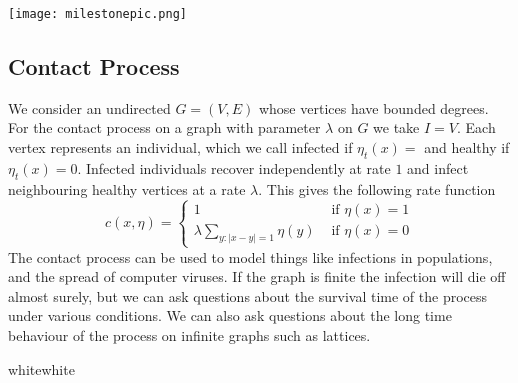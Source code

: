 \documentclass[14pt,a2paper,landscape]{article}
\begin{document}
\begin{multicols*}{3}
{\begin{center}
\texttt{[image: milestonepic.png]}
\end{center}

\subsection*{Contact Process}
We consider an undirected $G=(V,E)$ whose vertices have bounded degrees. For the contact process on 
a graph with parameter $\lambda$ on $G$ we take $I=V$. Each vertex represents an individual, which we call 
infected if $\eta_{t}(x)=$ and healthy if $\eta_{t}(x)=0$. Infected individuals recover independently at rate $1$
and infect neighbouring healthy vertices at a rate $\lambda$. This gives the following rate function
\begin{equation*}
c(x, \eta)=
\begin{cases}
1 & \mbox{ if } \eta(x)=1\\
\lambda \sum_{y: |x-y|=1}\eta(y) & \mbox{ if } \eta(x)=0
\end{cases}
\end{equation*}
The contact process can be used to model things like infections in populations, and the spread of computer
viruses. If the graph is finite the infection will die off almost surely, but we can ask questions about the 
survival time of the process under various conditions. We can also ask questions about the long time 
behaviour of the process on infinite graphs such as lattices.

}{white}{white}


\end{multicols*}
\end{document}
